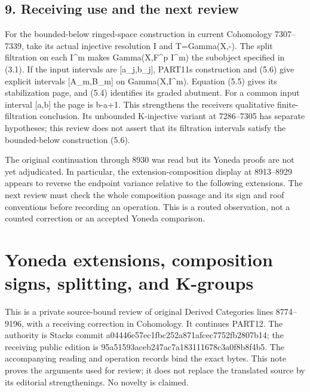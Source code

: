 \documentclass[11pt]{article}
\begin{document}
\subsection{9. Receiving use and the next review}\label{proofs-8352-8772-receiving-use-and-the-next-review}

For the bounded-below ringed-space construction in current Cohomology 7307–\allowbreak{}7339,\allowbreak{} take its actual injective resolution I and T\allowbreak{}=Gamma(X,\allowbreak{}-)\allowbreak{}. The split filtration on each I\^{}m makes Gamma(X,\allowbreak{}F\textasciicircum{}p I\textasciicircum{}m)\allowbreak{} the subobject specified in (3.1)\allowbreak{}. If the input intervals are [a\_\allowbreak{}j,\allowbreak{}b\_\allowbreak{}j]\allowbreak{},\allowbreak{} PART11\textquotesingle s construction and (5.6)\allowbreak{} give explicit intervals [A\_\allowbreak{}m,\allowbreak{}B\_\allowbreak{}m]\allowbreak{} on Gamma(X,\allowbreak{}I\textasciicircum{}m)\allowbreak{}. Equation (5.5)\allowbreak{} gives its stabilization page,\allowbreak{} and (5.4)\allowbreak{} identifies its graded abutment. For a common input interval [a,\allowbreak{}b]\allowbreak{} the page is b-a\allowbreak{}+1. This strengthens the receiver\textquotesingle s qualitative finite- filtration conclusion. Its unbounded K-injective variant at 7286–\allowbreak{}7305 has separate hypotheses; this review does not assert that its filtration intervals satisfy the bounded-below construction (5.6)\allowbreak{}.

The original continuation through 8930 was read but its Yoneda proofs are not yet adjudicated. In particular,\allowbreak{} the extension-composition display at 8913–\allowbreak{}8929 appears to reverse the endpoint variance relative to the following extensions. The next review must check the whole composition passage and its sign and roof conventions before recording an operation. This is a routed observation,\allowbreak{} not a counted correction or an accepted Yoneda comparison.
\clearpage
\section{\texorpdfstring{Yoneda extensions,\allowbreak{} composition signs,\allowbreak{} splitting,\allowbreak{} and K-groups}{Yoneda  composition   and K-groups}}\label{proofs-8774-9196-yoneda-extensions-composition-signs-splitting-and-k-groups}

This is a private source-bound review of original Derived Categories lines 8774–\allowbreak{}9196,\allowbreak{} with a receiving correction in Cohomology. It continues PART12. The authority is Stacks commit a04446e5\allowbreak{}7ec1fbc2\allowbreak{}52a871af\allowbreak{}cec7752f\allowbreak{}b2807b14; the receiving public edition is 95a51593\allowbreak{}aceb247a\allowbreak{}c7a18311\allowbreak{}1678c3a0\allowbreak{}f8b8f4b5. The accompanying reading and operation records bind the exact bytes. This note proves the arguments used for review; it does not replace the translated source by its editorial strengthenings. No novelty is claimed.
\end{document}
